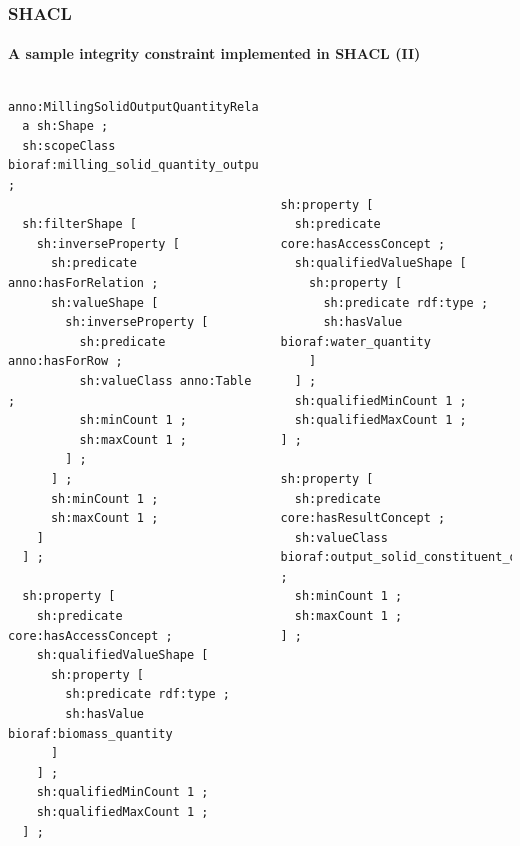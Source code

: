 \documentclass{beamer}
\begin{document}
\begin{frame}[fragile]
  \frametitle{SHACL}
  \framesubtitle{A sample integrity constraint implemented in SHACL (II)}

  \begin{columns}[t]

    \begin{Verbatim}[fontsize=\tiny]
anno:MillingSolidOutputQuantityRelationshipShape
  a sh:Shape ;
  sh:scopeClass bioraf:milling_solid_quantity_output_relation ;

  sh:filterShape [
    sh:inverseProperty [
      sh:predicate anno:hasForRelation ;
      sh:valueShape [
        sh:inverseProperty [
          sh:predicate anno:hasForRow ;
          sh:valueClass anno:Table ;
          sh:minCount 1 ;
          sh:maxCount 1 ;
        ] ;
      ] ;
      sh:minCount 1 ;
      sh:maxCount 1 ;
    ]
  ] ;

  sh:property [
    sh:predicate core:hasAccessConcept ;
    sh:qualifiedValueShape [
      sh:property [
        sh:predicate rdf:type ;
        sh:hasValue bioraf:biomass_quantity
      ]
    ] ;
    sh:qualifiedMinCount 1 ;
    sh:qualifiedMaxCount 1 ;
  ] ;
    \end{Verbatim}


    \begin{Verbatim}[fontsize=\tiny]





sh:property [
  sh:predicate core:hasAccessConcept ;
  sh:qualifiedValueShape [
    sh:property [
      sh:predicate rdf:type ;
      sh:hasValue bioraf:water_quantity
    ]
  ] ;
  sh:qualifiedMinCount 1 ;
  sh:qualifiedMaxCount 1 ;
] ;

sh:property [
  sh:predicate core:hasResultConcept ;
  sh:valueClass bioraf:output_solid_constituent_quantity ;
  sh:minCount 1 ;
  sh:maxCount 1 ;
] ;
    \end{Verbatim}
  \end{columns}
\end{frame}
\end{document}
